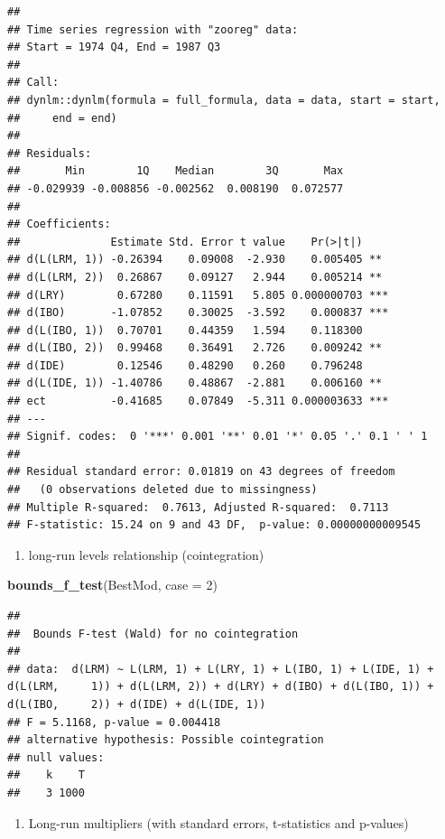\documentclass[
]{book}
\newenvironment{Shaded}{\begin{snugshade}}{\end{snugshade}}
\newcommand{\AttributeTok}[1]{\textcolor[rgb]{0.13,0.29,0.53}{#1}}
\newcommand{\DecValTok}[1]{\textcolor[rgb]{0.00,0.00,0.81}{#1}}
\newcommand{\FunctionTok}[1]{\textcolor[rgb]{0.13,0.29,0.53}{\textbf{#1}}}
\newcommand{\NormalTok}[1]{#1}
\providecommand{\tightlist}{%
  \setlength{\itemsep}{0pt}\setlength{\parskip}{0pt}}
\begin{document}
\begin{verbatim}
## 
## Time series regression with "zooreg" data:
## Start = 1974 Q4, End = 1987 Q3
## 
## Call:
## dynlm::dynlm(formula = full_formula, data = data, start = start, 
##     end = end)
## 
## Residuals:
##       Min        1Q    Median        3Q       Max 
## -0.029939 -0.008856 -0.002562  0.008190  0.072577 
## 
## Coefficients:
##              Estimate Std. Error t value    Pr(>|t|)    
## d(L(LRM, 1)) -0.26394    0.09008  -2.930    0.005405 ** 
## d(L(LRM, 2))  0.26867    0.09127   2.944    0.005214 ** 
## d(LRY)        0.67280    0.11591   5.805 0.000000703 ***
## d(IBO)       -1.07852    0.30025  -3.592    0.000837 ***
## d(L(IBO, 1))  0.70701    0.44359   1.594    0.118300    
## d(L(IBO, 2))  0.99468    0.36491   2.726    0.009242 ** 
## d(IDE)        0.12546    0.48290   0.260    0.796248    
## d(L(IDE, 1)) -1.40786    0.48867  -2.881    0.006160 ** 
## ect          -0.41685    0.07849  -5.311 0.000003633 ***
## ---
## Signif. codes:  0 '***' 0.001 '**' 0.01 '*' 0.05 '.' 0.1 ' ' 1
## 
## Residual standard error: 0.01819 on 43 degrees of freedom
##   (0 observations deleted due to missingness)
## Multiple R-squared:  0.7613, Adjusted R-squared:  0.7113 
## F-statistic: 15.24 on 9 and 43 DF,  p-value: 0.00000000009545
\end{verbatim}

\begin{enumerate}
\def\labelenumi{\arabic{enumi}.}
\setcounter{enumi}{3}
\tightlist
\item
  long-run levels relationship (cointegration)
\end{enumerate}

\begin{Shaded}
\begin{Highlighting}[]
\FunctionTok{bounds\_f\_test}\NormalTok{(BestMod, }\AttributeTok{case =} \DecValTok{2}\NormalTok{)}
\end{Highlighting}
\end{Shaded}

\begin{verbatim}
## 
##  Bounds F-test (Wald) for no cointegration
## 
## data:  d(LRM) ~ L(LRM, 1) + L(LRY, 1) + L(IBO, 1) + L(IDE, 1) + d(L(LRM,     1)) + d(L(LRM, 2)) + d(LRY) + d(IBO) + d(L(IBO, 1)) + d(L(IBO,     2)) + d(IDE) + d(L(IDE, 1))
## F = 5.1168, p-value = 0.004418
## alternative hypothesis: Possible cointegration
## null values:
##    k    T 
##    3 1000
\end{verbatim}

\begin{enumerate}
\def\labelenumi{\arabic{enumi}.}
\setcounter{enumi}{4}
\tightlist
\item
  Long-run multipliers (with standard errors, t-statistics and
  p-values)
\end{enumerate}
\end{document}

